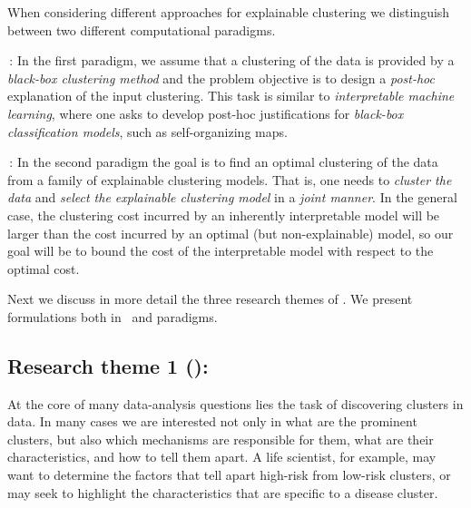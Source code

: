 \documentclass[a4paper,11pt]{article}
\begin{document}
\vspace{-2mm}
When considering different approaches for explainable clustering we distinguish between 
two different computational paradigms. 


\smallskip
{\posthoc\,:}
In the first paradigm, we assume that a clustering of the data is provided 
by a \emph{black-box clustering method} and the problem objective is to design 
a \emph{post-hoc} explanation of the input clustering.
This task is similar to \emph{interpretable machine learning}, 
where one asks to develop post-hoc justifications for 
\emph{black-box classification models}, such as self-organizing maps. 

\smallskip
{\joint\,:}
In the second paradigm the goal is to find an optimal clustering of the data
from a family of explainable clustering models.
That is, one needs to \emph{cluster the data} and \emph{select the explainable clustering model}
in a \emph{joint manner}.
In the general case, the clustering cost incurred by an inherently interpretable model 
will be larger than the cost incurred by an optimal (but non-explainable) model, 
so our goal will be to bound the cost of the interpretable model with respect to the optimal cost.

\smallskip
Next we discuss in more detail the three research themes of \acronym.
We present formulations both in \posthoc\ and \joint paradigms.


\subsection*{Research theme 1 (\rto): \newmodels}

At the core of many data-analysis questions lies the task of discovering clusters in data. 
In many cases we are interested not only in what are the prominent clusters, 
but also which mechanisms are responsible for them,  
what are their characteristics, and how to tell them apart.  
A life scientist, for example, may want to determine the factors that tell apart 
high-risk from low-risk clusters, 
or may seek to highlight the characteristics that are specific to a disease cluster.  
\end{document}
